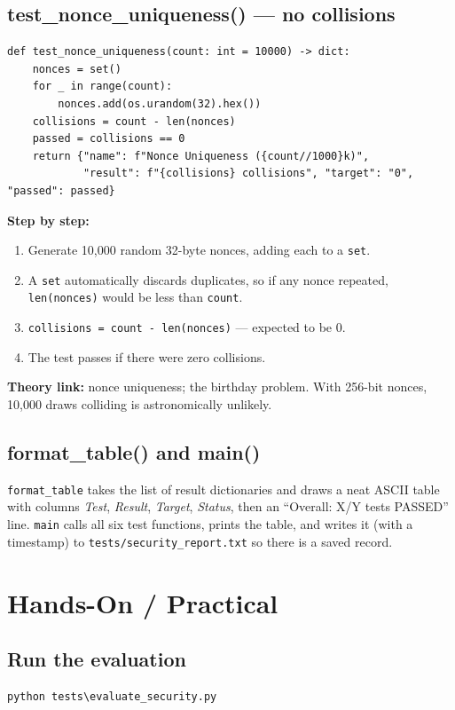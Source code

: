 \documentclass[11pt,a4paper]{article}
\begin{document}
\subsection{test\_nonce\_uniqueness() --- no collisions}
\begin{lstlisting}[style=py,caption={evaluate\_security.py --- the nonce uniqueness test.}]
def test_nonce_uniqueness(count: int = 10000) -> dict:
    nonces = set()
    for _ in range(count):
        nonces.add(os.urandom(32).hex())
    collisions = count - len(nonces)
    passed = collisions == 0
    return {"name": f"Nonce Uniqueness ({count//1000}k)",
            "result": f"{collisions} collisions", "target": "0", "passed": passed}
\end{lstlisting}
\textbf{Step by step:}
\begin{enumerate}
  \item Generate 10{,}000 random 32-byte nonces, adding each to a \texttt{set}.
  \item A \texttt{set} automatically discards duplicates, so if any nonce
        repeated, \texttt{len(nonces)} would be less than \texttt{count}.
  \item \texttt{collisions = count - len(nonces)} --- expected to be 0.
  \item The test passes if there were zero collisions.
\end{enumerate}
\textbf{Theory link:} nonce uniqueness; the birthday problem. With 256-bit
nonces, 10{,}000 draws colliding is astronomically unlikely.

\subsection{format\_table() and main()}
\texttt{format\_table} takes the list of result dictionaries and draws a neat
ASCII table with columns \emph{Test}, \emph{Result}, \emph{Target},
\emph{Status}, then an ``Overall: X/Y tests PASSED'' line. \texttt{main} calls
all six test functions, prints the table, and writes it (with a timestamp) to
\texttt{tests/security\_report.txt} so there is a saved record.

\section{Hands-On / Practical}

\subsection{Run the evaluation}
\begin{lstlisting}[style=term]
python tests\evaluate_security.py
\end{lstlisting}
\end{document}
